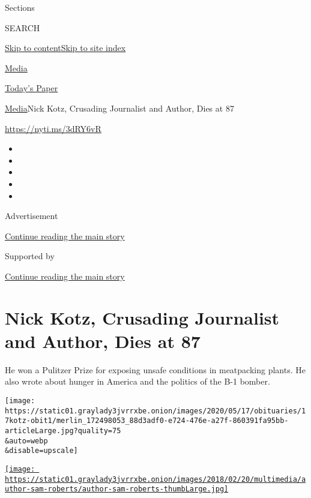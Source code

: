 Sections

SEARCH

\protect\hyperlink{site-content}{Skip to
content}\protect\hyperlink{site-index}{Skip to site index}

\href{https://www.nytimes3xbfgragh.onion/section/business/media}{Media}

\href{https://myaccount.nytimes3xbfgragh.onion/auth/login?response_type=cookie\&client_id=vi}{}

\href{https://www.nytimes3xbfgragh.onion/section/todayspaper}{Today's
Paper}

\href{/section/business/media}{Media}\textbar{}Nick Kotz, Crusading
Journalist and Author, Dies at 87

\url{https://nyti.ms/3dRY6vR}

\begin{itemize}
\item
\item
\item
\item
\item
\end{itemize}

Advertisement

\protect\hyperlink{after-top}{Continue reading the main story}

Supported by

\protect\hyperlink{after-sponsor}{Continue reading the main story}

\hypertarget{nick-kotz-crusading-journalist-and-author-dies-at-87}{%
\section{Nick Kotz, Crusading Journalist and Author, Dies at
87}\label{nick-kotz-crusading-journalist-and-author-dies-at-87}}

He won a Pulitzer Prize for exposing unsafe conditions in meatpacking
plants. He also wrote about hunger in America and the politics of the
B-1 bomber.

\texttt{[image: https://static01.graylady3jvrrxbe.onion/images/2020/05/17/obituaries/17kotz-obit1/merlin\_172498053\_88d3adf0-e724-476e-a27f-860391fa95bb-articleLarge.jpg?quality=75\\\&auto=webp\\\&disable=upscale]}

\href{https://www.nytimes3xbfgragh.onion/by/sam-roberts}{\texttt{[image: https://static01.graylady3jvrrxbe.onion/images/2018/02/20/multimedia/author-sam-roberts/author-sam-roberts-thumbLarge.jpg]}}

